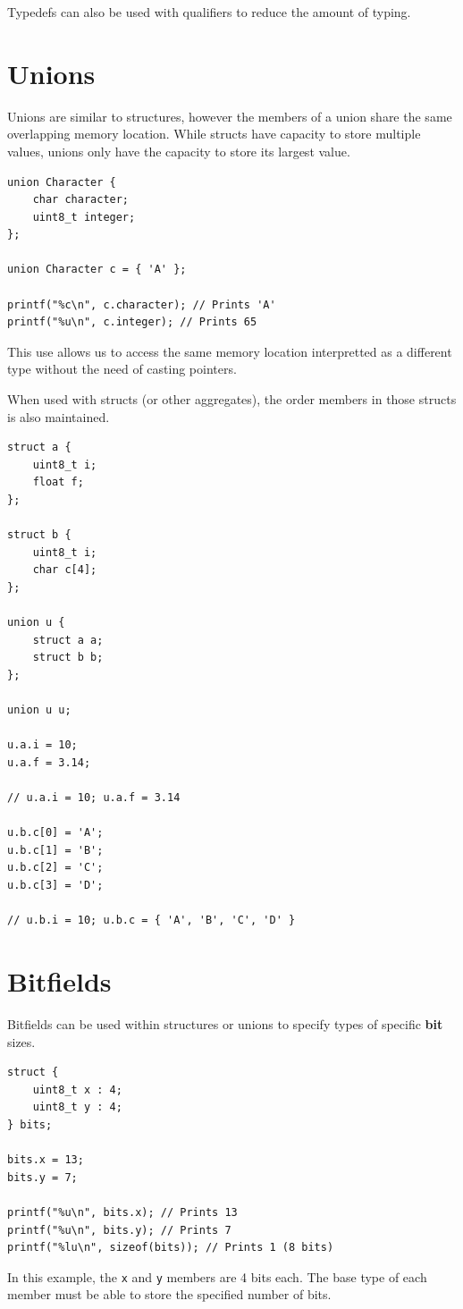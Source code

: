 \documentclass[a4paper]{report}
\begin{document}
Typedefs can also be used with qualifiers to reduce the amount of typing.
\section{Unions}
Unions are similar to structures, however the members of a union share the same overlapping memory location.
While structs have capacity to store multiple values, unions only have the capacity to store its largest value.
\begin{verbatim}
union Character {
    char character;
    uint8_t integer;
};

union Character c = { 'A' };

printf("%c\n", c.character); // Prints 'A'
printf("%u\n", c.integer); // Prints 65
\end{verbatim}
This use allows us to access the same memory location interpretted as
a different type without the need of casting pointers.

When used with structs (or other aggregates), the order members in those structs is
also maintained.
\begin{verbatim}
struct a {
    uint8_t i;
    float f;
};

struct b {
    uint8_t i;
    char c[4];
};

union u {
    struct a a;
    struct b b;
};

union u u;

u.a.i = 10;
u.a.f = 3.14;

// u.a.i = 10; u.a.f = 3.14

u.b.c[0] = 'A';
u.b.c[1] = 'B';
u.b.c[2] = 'C';
u.b.c[3] = 'D';

// u.b.i = 10; u.b.c = { 'A', 'B', 'C', 'D' }
\end{verbatim}
\section{Bitfields}
Bitfields can be used within structures or unions to specify types
of specific \textbf{bit} sizes.
\begin{verbatim}
struct {
    uint8_t x : 4;
    uint8_t y : 4;
} bits;

bits.x = 13;
bits.y = 7;

printf("%u\n", bits.x); // Prints 13
printf("%u\n", bits.y); // Prints 7
printf("%lu\n", sizeof(bits)); // Prints 1 (8 bits)
\end{verbatim}
In this example, the \texttt{x} and \texttt{y} members are 4 bits each.
The base type of each member must be able to store the specified number of bits.
\end{document}
